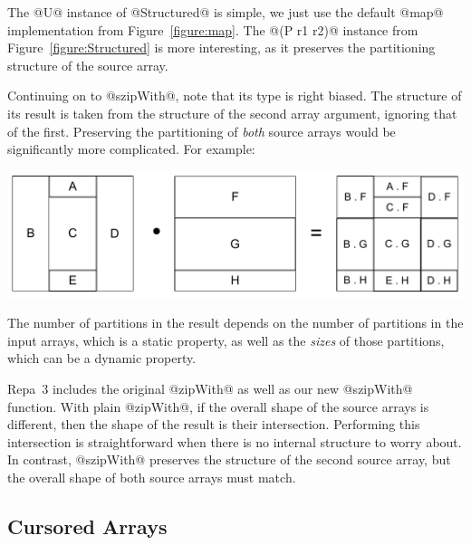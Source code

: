 The @U@ instance of @Structured@ is simple, we just use the default @map@ implementation from Figure~\ref{figure:map}. The @(P r1 r2)@ instance from Figure~\ref{figure:Structured} is more interesting, as it preserves the partitioning structure of the source array.

Continuing on to @szipWith@, note that its type is right biased. The structure of its result is taken from the structure of the second array argument, ignoring that of the first. Preserving the partitioning of \emph{both} source arrays would be significantly more complicated. For example:
%
\begin{center}
\includegraphics[scale=0.35]{figs/guiding-zipwith-partitions}
\end{center}
%
The number of partitions in the result depends on the number of partitions in the input arrays, which is a static property, as well as the \emph{sizes} of those partitions, which can be a dynamic property.

Repa~3 includes the original @zipWith@ as well as our new @szipWith@ function. With plain @zipWith@, if the overall shape of the source arrays is different, then the shape of the result is their intersection. Performing this intersection is straightforward when there is no internal structure to worry about. In contrast, @szipWith@  preserves the structure of the second source array, but the overall shape of both source arrays must match. 



\subsection{Cursored Arrays}
\label{section:Cursored}

